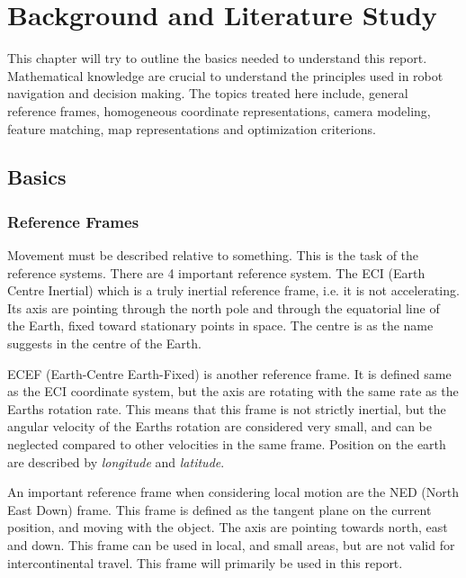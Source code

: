 


\chapter{Background and Literature Study}
\label{chap2}
This chapter will try to outline the basics needed to understand this report. Mathematical
knowledge are crucial to understand the principles used in robot navigation and decision
making. The topics treated here include, general reference frames, homogeneous coordinate
representations, camera modeling, feature matching, map representations and optimization
criterions.



\section{Basics}

\subsection{Reference Frames}
	Movement must be described relative to something. This is the task of the reference systems. There are
	4 important reference system. The ECI (Earth Centre Inertial) which is a truly inertial reference
	frame, i.e. it is not accelerating. Its axis are pointing through the north pole and through the
	equatorial line of the Earth, fixed toward stationary points in space. The centre is as the name
	suggests in the centre of the Earth. 
	
	ECEF (Earth-Centre Earth-Fixed) is another reference frame. It is defined same as the ECI coordinate
	system, but the axis are rotating with the same rate as the Earths rotation rate. This means that this frame
	is not
	strictly inertial, but the angular velocity of the Earths rotation are considered very small, and can
	be neglected compared to other velocities in the same frame. Position on the earth are described by
	\emph{longitude} and \emph{latitude}.

	An important reference frame when considering local motion are the NED (North East Down) frame. This
	frame is defined as the tangent plane on the current position, and moving with the object. The axis
	are pointing towards north, east and down. This frame can be used in local, and small areas, but are
	not valid for intercontinental travel. This frame will primarily be used in this report. 

